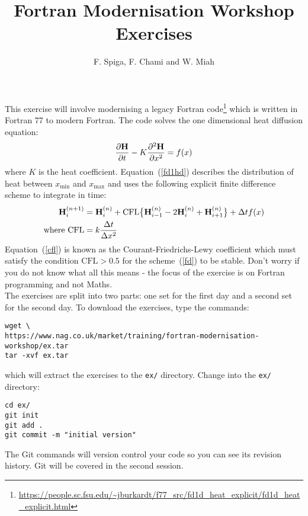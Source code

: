 \documentclass[12pt]{article}
\begin{document}
 
 
 
\title{\bf Fortran Modernisation Workshop \\ Exercises}
\author{F. Spiga, F. Chami and W. Miah}
 
\maketitle

This exercise will involve modernising a legacy Fortran code\footnote{\url{https://people.sc.fsu.edu/~jburkardt/f77_src/fd1d_heat_explicit/fd1d_heat_explicit.html}} which is written 
in Fortran 77 to modern Fortran. The code solves the one dimensional heat
diffusion equation:
\begin{equation} \label{fd1hd}
\frac{\partial{\bf H}}{\partial t} - K\frac{\partial^{2}{\bf H}}{\partial x^{2}} = f(x)
\end{equation}
where $K$ is the heat coefficient. Equation~(\ref{fd1hd}) describes the distribution of heat 
between $x_{\text{min}}$ and $x_{\text{max}}$ and uses the following explicit finite difference 
scheme to integrate in time:
\begin{align}
{\bf H}^{(n+1)}_{i} & = {\bf H}^{(n)}_{i} + \text{CFL}\big\{{\bf H}^{(n)}_{i-1}-2{\bf H}^{(n)}_{i} +
                      {\bf H}^{(n)}_{i+1}\big\} + \Delta t f(x) \label{fd} \\
            \text{where CFL} & = k\frac{\Delta t}{\Delta x^{2}} \label{cfl}
\end{align}
Equation~(\ref{cfl}) is known as the Courant-Friedrichs-Lewy coefficient which must satisfy
the condition $\text{CFL} > 0.5$ for the scheme~(\ref{fd}) to be stable. Don't worry if you do 
not know what all this means - the focus of the exercise is on Fortran programming and not
Maths. \\

The exercises are split into two parts: one set for the first day and a second
set for the second day. To download the exercises, type the commands:
\begin{verbatim}
wget \
https://www.nag.co.uk/market/training/fortran-modernisation-workshop/ex.tar
tar -xvf ex.tar
\end{verbatim}
which will extract the exercises to the \texttt{ex/} directory. Change into the 
\texttt{ex/} directory:
\begin{verbatim}
cd ex/
git init
git add .
git commit -m "initial version"
\end{verbatim}
The Git commands will version control your code so you can see its revision history. Git will
be covered in the second session. \\
\end{document}
